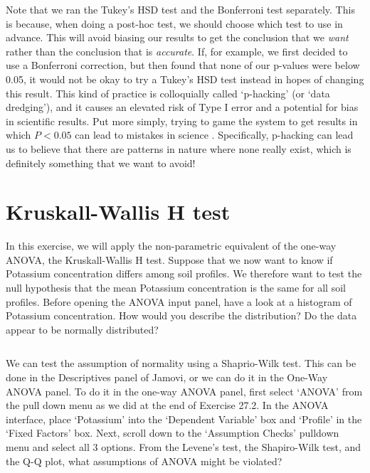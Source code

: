 \documentclass[
]{scrbook}
\begin{document}
\begin{verbatim}

\end{verbatim}

Note that we ran the Tukey's HSD test and the Bonferroni test separately.
This is because, when doing a post-hoc test, we should choose which test to use in advance.
This will avoid biasing our results to get the conclusion that we \emph{want} rather than the conclusion that is \emph{accurate}.
If, for example, we first decided to use a Bonferroni correction, but then found that none of our p-values were below 0.05, it would not be okay to try a Tukey's HSD test instead in hopes of changing this result.
This kind of practice is colloquially called `p-hacking' (or `data dredging'), and it causes an elevated risk of Type I error and a potential for bias in scientific results.
Put more simply, trying to game the system to get results in which \(P < 0.05\) can lead to mistakes in science \citep{Head2015}.
Specifically, p-hacking can lead us to believe that there are patterns in nature where none really exist, which is definitely something that we want to avoid!

\hypertarget{kruskall-wallis-h-test}{%
\section{Kruskall-Wallis H test}\label{kruskall-wallis-h-test}}

In this exercise, we will apply the non-parametric equivalent of the one-way ANOVA, the Kruskall-Wallis H test.
Suppose that we now want to know if Potassium concentration differs among soil profiles.
We therefore want to test the null hypothesis that the mean Potassium concentration is the same for all soil profiles.
Before opening the ANOVA input panel, have a look at a histogram of Potassium concentration.
How would you describe the distribution?
Do the data appear to be normally distributed?

\begin{verbatim}

\end{verbatim}

We can test the assumption of normality using a Shaprio-Wilk test.
This can be done in the Descriptives panel of Jamovi, or we can do it in the One-Way ANOVA panel.
To do it in the one-way ANOVA panel, first select `ANOVA' from the pull down menu as we did at the end of Exercise 27.2.
In the ANOVA interface, place `Potassium' into the `Dependent Variable' box and `Profile' in the `Fixed Factors' box.
Next, scroll down to the `Assumption Checks' pulldown menu and select all 3 options.
From the Levene's test, the Shapiro-Wilk test, and the Q-Q plot, what assumptions of ANOVA might be violated?
\end{document}
